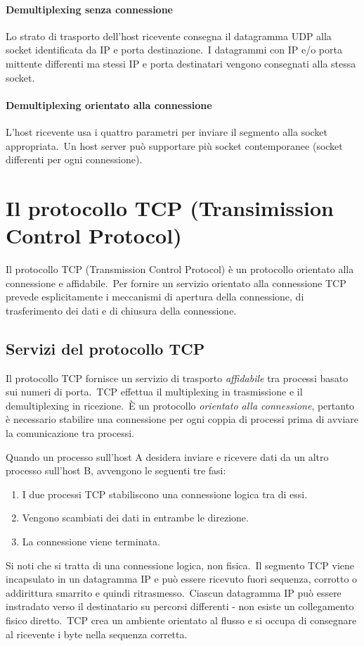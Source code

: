 \paragraph{Demultiplexing senza connessione}

Lo strato di trasporto dell'host ricevente consegna il datagramma UDP alla socket identificata da IP e porta destinazione.\
I datagrammi con IP e/o porta mittente differenti ma stessi IP e porta destinatari vengono consegnati alla stessa socket.

\paragraph{Demultiplexing orientato alla connessione}

L'host ricevente usa i quattro parametri per inviare il segmento alla socket appropriata.\
Un host server può supportare più socket contemporanee (socket differenti per ogni connessione).

\section{Il protocollo TCP (Transimission Control Protocol)}

Il protocollo TCP (Transmission Control Protocol) è un protocollo orientato alla connessione e affidabile.\
Per fornire un servizio orientato alla connessione TCP prevede esplicitamente i meccanismi di apertura della connessione, di trasferimento dei dati e di chiusura della connessione.

\subsection{Servizi del protocollo TCP}

Il protocollo TCP fornisce un servizio di trasporto \emph{affidabile} tra processi basato sui numeri di porta.\
TCP effettua il multiplexing in trasmissione e il demultiplexing in ricezione.\
È un protocollo \emph{orientato alla connessione}, pertanto è necessario stabilire una connessione per ogni coppia di processi prima di avviare la comunicazione tra processi.

Quando un processo sull'host A desidera inviare e ricevere dati da un altro processo sull'host B, avvengono le seguenti tre fasi:

\begin{enumerate}
    \item I due processi TCP stabiliscono una connessione logica tra di essi.
    \item Vengono scambiati dei dati in entrambe le direzione.
    \item La connessione viene terminata.
\end{enumerate}
Si noti che si tratta di una connessione logica, non fisica.\
Il segmento TCP viene incapsulato in un datagramma IP e può essere ricevuto fuori sequenza, corrotto o addirittura smarrito e quindi ritrasmesso.\
Ciascun datagramma IP può essere instradato verso il destinatario su percorsi differenti - non esiste un collegamento fisico diretto.\
TCP crea un ambiente orientato al flusso e si occupa di consegnare al ricevente i byte nella sequenza corretta.

